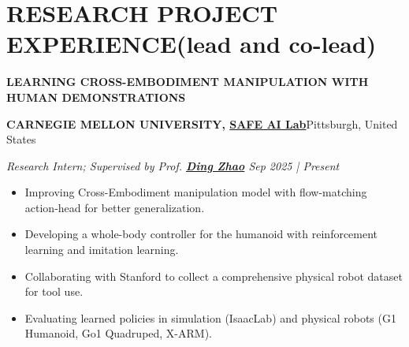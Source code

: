 \documentclass[a4paper,9pt]{extarticle}
\begin{document}
\section*{{\textbf{\fontsize{14pt}{8pt}\selectfont R}\textbf{\scshape ESEARCH PROJECT EXPERIENCE}}(lead and co-lead)}
{\textbf{\fontsize{12pt}{4pt}\selectfont L}\textbf{\scshape EARNING CROSS-EMBODIMENT MANIPULATION WITH HUMAN DEMONSTRATIONS}}
\par\vspace{4pt}\noindent
\par\textbf{CARNEGIE MELLON UNIVERSITY, {\href{https://safeai-lab.github.io/}{SAFE AI Lab}}}\hfill Pittsburgh, United States  %
\par\textit{Research Intern; Supervised by Prof. {\href{https://www.meche.engineering.cmu.edu/directory/bios/zhao-ding.html}{\textbf{Ding Zhao}}}   \hfill Sep 2025 | Present}  %
\begin{itemize}
    \item Improving Cross-Embodiment manipulation model with flow-matching action-head for better generalization.
    \item Developing a whole-body controller for the humanoid with reinforcement learning and imitation learning.
    \item Collaborating with Stanford to collect a comprehensive physical robot dataset for tool use.
    \item Evaluating learned policies in simulation (IsaacLab) and physical robots (G1 Humanoid, Go1 Quadruped, X-ARM).  
\end{itemize}
\end{document}
